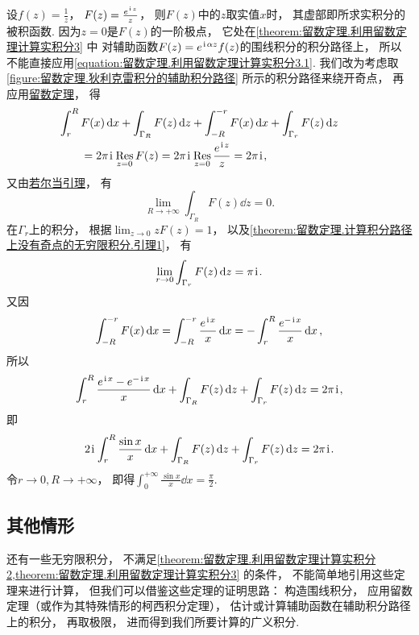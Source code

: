 \begin{example}
\begin{solution}
设\(f(z) = \frac{1}{z}\)，
\(F(z) = \frac{e^{\kern1pt\mathrm{i}\kern1pt z}}{z}\)，
则\(F(z)\)中的\(z\)取实值\(x\)时，
其虚部即所求实积分的被积函数.
因为\(z=0\)是\(F(z)\)的一阶极点，
它处在\cref{theorem:留数定理.利用留数定理计算实积分3} 中
对辅助函数\(F(z) = e^{\kern1pt\mathrm{i}\kern1pt\alpha z} f(z)\)的围线积分的积分路径上，
所以不能直接应用\cref{equation:留数定理.利用留数定理计算实积分3.1}.
我们改为考虑取\cref{figure:留数定理.狄利克雷积分的辅助积分路径} 所示的积分路径来绕开奇点，
再应用\hyperref[theorem:留数定理.柯西留数定理]{留数定理}，
得\begin{align*}
	&\hspace{-20pt}\int_r^R F(x) \dd{x}
	+ \int_{\Gamma_R} F(z) \dd{z}
	+ \int_{-R}^{-r} F(x) \dd{x}
	+ \int_{\Gamma_r} F(z) \dd{z} \\
	&= 2\pi\iu \Res_{z=0} F(z)
	= 2\pi\iu \Res_{z=0} \frac{e^{\iu z}}{z}
	= 2\pi\iu,
\end{align*}
又由\hyperref[theorem:留数定理.计算积分路径上没有奇点的无穷限积分.引理2]{若尔当引理}，
有\begin{equation*}
	\lim_{R\to+\infty} \int_{\Gamma_R} F(z) \dd{z} = 0.
\end{equation*}
在\(\Gamma_r\)上的积分，
根据\(\lim_{z\to0} z F(z) = 1\)，
以及\cref{theorem:留数定理.计算积分路径上没有奇点的无穷限积分.引理1}，
有\begin{equation*}
	\lim_{r\to0} \int_{\Gamma_r} F(z) \dd{z} = \pi\kern1pt\mathrm{i}\kern1pt.
\end{equation*}
又因\begin{equation*}
	\int_{-R}^{-r} F(x) \dd{x}
	= \int_{-R}^{-r} \frac{e^{\kern1pt\mathrm{i}\kern1pt x}}{x} \dd{x}
	= -\int_r^R \frac{e^{-\kern1pt\mathrm{i}\kern1pt x}}{x} \dd{x},
\end{equation*}
所以\begin{equation*}
	\int_r^R \frac{e^{\kern1pt\mathrm{i}\kern1pt x} - e^{-\kern1pt\mathrm{i}\kern1pt x}}{x} \dd{x}
	+ \int_{\Gamma_R} F(z) \dd{z}
	+ \int_{\Gamma_r} F(z) \dd{z}
	= 2\pi\kern1pt\mathrm{i}\kern1pt,
\end{equation*}
即\begin{equation*}
	2\kern1pt\mathrm{i}\kern1pt \int_r^R \frac{\sin x}{x} \dd{x}
	+ \int_{\Gamma_R} F(z) \dd{z}
	+ \int_{\Gamma_r} F(z) \dd{z}
	= 2\pi\kern1pt\mathrm{i}\kern1pt.
\end{equation*}
令\(r\to0, R\to+\infty\)，
即得\(\int_0^{+\infty} \frac{\sin x}{x} \dd{x} = \frac{\pi}{2}\).
\end{solution}
\end{example}

\subsection{其他情形}
还有一些无穷限积分，
不满足\cref{theorem:留数定理.利用留数定理计算实积分2,theorem:留数定理.利用留数定理计算实积分3} 的条件，
不能简单地引用这些定理来进行计算，
但我们可以借鉴这些定理的证明思路：
构造围线积分，
应用留数定理（或作为其特殊情形的柯西积分定理），
估计或计算辅助函数在辅助积分路径上的积分，
再取极限，
进而得到我们所要计算的广义积分.

